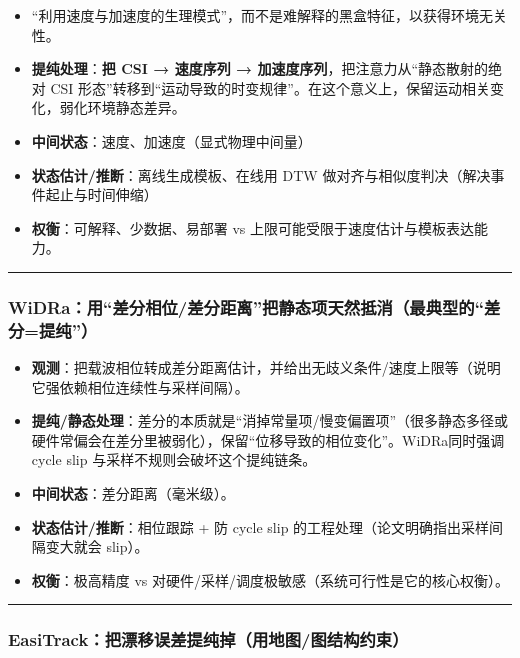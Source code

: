 \documentclass[
]{article}
\begin{document}
\begin{itemize}
\item
  ``利用速度与加速度的生理模式''，而不是难解释的黑盒特征，以获得环境无关性。
\item
  \textbf{提纯处理}：\textbf{把 CSI → 速度序列 →
  加速度序列}，把注意力从``静态散射的绝对 CSI
  形态''转移到``运动导致的时变规律''。在这个意义上，保留运动相关变化，弱化环境静态差异。
\item
  \textbf{中间状态}：速度、加速度（显式物理中间量）
\item
  \textbf{状态估计/推断}：离线生成模板、在线用 DTW
  做对齐与相似度判决（解决事件起止与时间伸缩）
\item
  \textbf{权衡}：可解释、少数据、易部署 vs
  上限可能受限于速度估计与模板表达能力。
\end{itemize}

\begin{center}\rule{0.5\linewidth}{0.5pt}\end{center}

\subsubsection{WiDRa：用``差分相位/差分距离''把静态项天然抵消（最典型的``差分=提纯''）}\label{widraux7528ux5deeux5206ux76f8ux4f4dux5deeux5206ux8dddux79bbux628aux9759ux6001ux9879ux5929ux7136ux62b5ux6d88ux6700ux5178ux578bux7684ux5deeux5206=ux63d0ux7eaf}

\begin{itemize}
\item
  \textbf{观测}：把载波相位转成差分距离估计，并给出无歧义条件/速度上限等（说明它强依赖相位连续性与采样间隔）。
\item
  \textbf{提纯/静态处理}：差分的本质就是``消掉常量项/慢变偏置项''（很多静态多径或硬件常偏会在差分里被弱化），保留``位移导致的相位变化''。WiDRa同时强调
  cycle slip 与采样不规则会破坏这个提纯链条。
\item
  \textbf{中间状态}：差分距离（毫米级）。
\item
  \textbf{状态估计/推断}：相位跟踪 + 防 cycle slip
  的工程处理（论文明确指出采样间隔变大就会 slip）。
\item
  \textbf{权衡}：极高精度 vs
  对硬件/采样/调度极敏感（系统可行性是它的核心权衡）。
\end{itemize}

\begin{center}\rule{0.5\linewidth}{0.5pt}\end{center}

\subsubsection{\texorpdfstring{EasiTrack：\textbf{把漂移误差提纯掉}（用地图/图结构约束）}{EasiTrack：把漂移误差提纯掉（用地图/图结构约束）}}\label{easitrackux628aux6f02ux79fbux8befux5deeux63d0ux7eafux6389ux7528ux5730ux56feux56feux7ed3ux6784ux7ea6ux675f}
\end{document}
